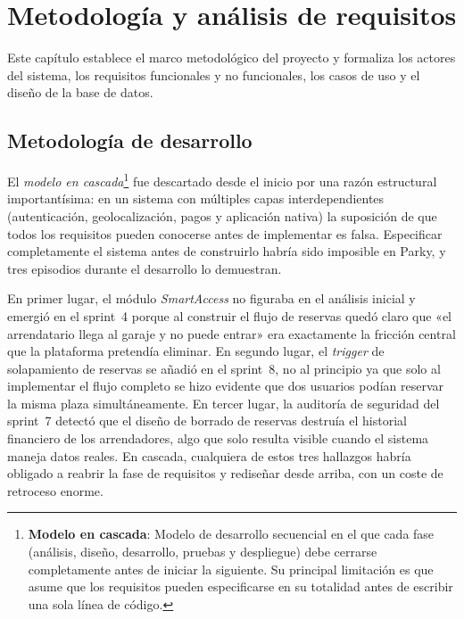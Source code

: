 \chapter{Metodología y análisis de requisitos}
\label{ch:metodologia}

Este capítulo establece el marco metodológico del proyecto y formaliza los actores del sistema, los requisitos funcionales y no funcionales, los casos de uso y el diseño de la base de datos.

\section{Metodología de desarrollo}
\label{sec:metodologia}

El \textit{modelo en cascada}\footnote{\textbf{Modelo en cascada}: Modelo de desarrollo secuencial en el que cada fase (análisis, diseño, desarrollo, pruebas y despliegue) debe cerrarse completamente antes de iniciar la siguiente. Su principal limitación es que asume que los requisitos pueden especificarse en su totalidad antes de escribir una sola línea de código.} fue descartado desde el inicio por una razón estructural importantísima: en un sistema con múltiples capas interdependientes (autenticación, geolocalización, pagos y aplicación nativa) la suposición de que todos los requisitos pueden conocerse antes de implementar es falsa. Especificar completamente el sistema antes de construirlo habría sido imposible en Parky, y tres episodios durante el desarrollo lo demuestran.

En primer lugar, el módulo \textit{SmartAccess} no figuraba en el análisis inicial y emergió en el sprint~4 porque al construir el flujo de reservas quedó claro que «el arrendatario llega al garaje y no puede entrar» era exactamente la fricción central que la plataforma pretendía eliminar. En segundo lugar, el \textit{trigger} de solapamiento de reservas se añadió en el sprint~8, no al principio ya que solo al implementar el flujo completo se hizo evidente que dos usuarios podían reservar la misma plaza simultáneamente. En tercer lugar, la auditoría de seguridad del sprint~7 detectó que el diseño de borrado de reservas destruía el historial financiero de los arrendadores, algo que solo resulta visible cuando el sistema maneja datos reales. En cascada, cualquiera de estos tres hallazgos habría obligado a reabrir la fase de requisitos y rediseñar desde arriba, con un coste de retroceso enorme.

